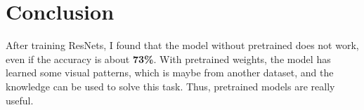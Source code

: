 \chapter{Conclusion}
\indent
	After training ResNets, I found that the model without pretrained does not work, even if 
	the accuracy is about \textbf{73\%}. With pretrained weights, the model has learned some 
	visual patterns, which is maybe from another dataset, and the knowledge can be used to solve this task.
	Thus, pretrained models are really useful.
